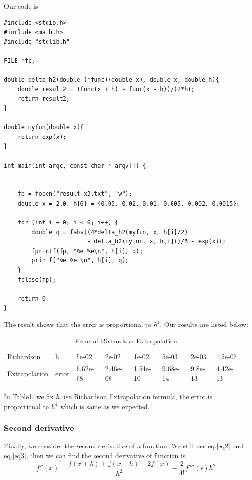 \documentclass{article}
\begin{document}
Our code is
\begin{lstlisting}
#include <stdio.h>
#include <math.h>
#include "stdlib.h"

FILE *fp;

double delta_h2(double (*func)(double x), double x, double h){
    double result2 = (func(x + h) - func(x - h))/(2*h);
    return result2;
}

double myfun(double x){
    return exp(x);
}

int main(int argc, const char * argv[]) {
    
    
    fp = fopen("result_x3.txt", "w");
    double x = 2.0, h[6] = {0.05, 0.02, 0.01, 0.005, 0.002, 0.0015};

    for (int i = 0; i < 6; i++) {
        double q = fabs((4*delta_h2(myfun, x, h[i]/2)
                        - delta_h2(myfun, x, h[i]))/3 - exp(x));
        fprintf(fp, "%e %e\n", h[i], q);
        printf("%e %e \n", h[i], q);
    }
    fclose(fp);
    
    return 0;
}
\end{lstlisting}
The result shows that the error is proportional to $h^4$. Our results are listed below:
\begin{table}
\begin{center}
\begin{tabular}{ | l | l | l | l | l | | l | | l | l | l | }
\hline
Richardson    & h       &5e-02      & 2e-02      & 1e-02     & 5e-03      &2e-03         &1.5e-03  \\ 
Extrapolation   & error & 9.62e-08 & 2.46e-09 &  1.54e-10 & 9.68e-14 & 9.8e-13  &4.42e-13\\ \hline                                 
\end{tabular}
\caption {Error of Richardson Extrapolation} \label{tab2}
\end{center}
\end{table}
In Table\ref{tab2}, we fix $h$ use Richardson Extrapolation formula, the error is proportional to $h^4$ which is same as we expected.

\subsubsection{Second derivative}

Finally, we consider the second derivative of a function. We still use eq.\ref{eq2} and eq.\ref{eq3}, then we can find the second derivative of function is
\begin{equation}
f''(x) = \frac{f(x + h) + f(x - h) -2f(x)}{h^2} - \frac{2}{4!}f''''{(\epsilon)}h^2
\end{equation}
\end{document}
